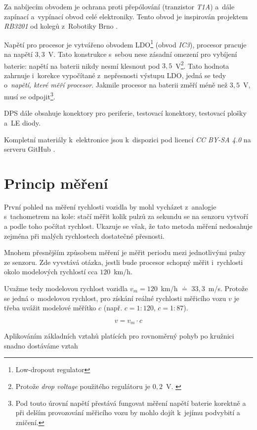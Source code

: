 Za nabíjecím obvodem je ochrana proti přepólování (tranzistor \textit{T1A})
a~dále zapínací a~vypínací obvod celé elektroniky. Tento obvod je inspirován
projektem \textit{RB3201} \cite{rb3201} od kolegů z~Robotiky Brno
\cite{roboticsbrno}.

Napětí pro procesor je vytvářeno obvodem \gls{LDO}\footnote{Low-dropout regulator}
(obvod \textit{IC3}), procesor pracuje na napětí $3,3$~V. Tato konstrukce
s~sebou nese zásadní omezení pro vybíjení baterie: napětí na baterii nikdy nesmí
klesnout pod $3,5$~V\footnote{Protože \textit{drop voltage} použitého
regulátoru je $0,2$~V. \cite{ldo:datasheet}}. Tato hodnota zahrnuje
i~korekce vypočítané z~nepřesnosti výstupu \gls{LDO}, jedná se tedy o~\textit{napětí,
které měří procesor}. Jakmile procesor na baterii změří méně než $3,5$~V, musí
se odpojit\footnote{Pod touto úrovní napětí přestává fungovat měření napětí
baterie korektně a při delším provozování měřicího vozu by mohlo dojít k~jejímu
podvybití a zničení.}.

DPS dále obsahuje konektory pro periferie, testovací konektory, testovací
plošky a~LE diody.

Kompletní materiály k~elektronice jsou k~dispozici pod licencí \textit{CC BY-SA
4.0} na serveru GitHub \cite{wsm-pcb}.

\section{Princip měření}
\label{sec:wsm-mer-princip}

První pohled na měření rychlosti vozidla by mohl vycházet z~analogie
s~tachometrem na kole: stačí měřit kolik pulzů za sekundu se na senzoru vytvoří
a podle toho počítat rychlost. Ukazuje se však, že tato metoda měření nedosahuje
zejména při malých rychlostech dostatečné přesnosti.

Mnohem přesnějším způsobem měření je měřit periodu mezi jednotlivými pulzy ze
senzoru. Zde vyvstává otázka, jestli bude procesor schopný měřit i~rychlosti
okolo modelových rychlostí cca $120$~km/h.

Uvažme tedy modelovou rychlost vozidla $v_m = 120$~km/h $\doteq$ $33,3$~m/s.
Protože se jedná o~modelovou rychlost, pro získání reálné rychlosti měřicího
vozu $v$ je třeba uvážit modelové měřítko $c$ (např. $c = 1:120$, $c = 1:87$).

$$v = v_m \cdot c$$

Aplikováním základních vztahů platících pro rovnoměrný pohyb po kružnici snadno
dostáváme vztah

